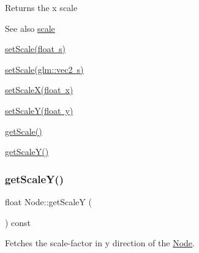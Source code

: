 \begin{DoxyReturn}{Returns}
the x scale 
\end{DoxyReturn}
\begin{DoxySeeAlso}{See also}
\mbox{\hyperlink{classsage_1_1Node_a3014b585d97d3a449e83bc0252db0c50}{scale}} 

\mbox{\hyperlink{classsage_1_1Node_a939698b2eb68ee5b60b91e2426e95369}{set\+Scale(float s)}} 

\mbox{\hyperlink{classsage_1_1Node_aecff30b003ce1c2266cc60a34b72559d}{set\+Scale(glm\+::vec2 s)}} 

\mbox{\hyperlink{classsage_1_1Node_ab8126397f90ccdee0755b984b26809d8}{set\+Scale\+X(float x)}} 

\mbox{\hyperlink{classsage_1_1Node_afa22161545d63e9e011f8eeb5acdead7}{set\+Scale\+Y(float y)}} 

\mbox{\hyperlink{classsage_1_1Node_af1a9bc0715acbc80623b5a15a5f65f3f}{get\+Scale()}} 

\mbox{\hyperlink{classsage_1_1Node_ab87661ab8940512baf2e7639ea55ff87}{get\+Scale\+Y()}} 
\end{DoxySeeAlso}
\mbox{\label{classsage_1_1Node_ab87661ab8940512baf2e7639ea55ff87}} 
\subsubsection{\texorpdfstring{getScaleY()}{getScaleY()}}
{\footnotesize\ttfamily float Node\+::get\+ScaleY (\begin{DoxyParamCaption}{ }\end{DoxyParamCaption}) const}



Fetches the scale-\/factor in y direction of the \mbox{\hyperlink{classsage_1_1Node}{Node}}. 


